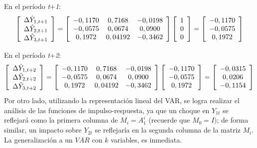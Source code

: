 En el per\'{i}odo \textit{t}$+$\textit{1}:
\[
\left[ {\begin{array}{*{20}c}
\Delta \hat{Y}_{1,t+1}\\
\Delta \hat{Y}_{2,t+1}\\
\Delta \hat{Y}_{3,t+1}\\
\end{array} } \right]=\left[ {\begin{array}{*{20}c}
-0,1170 & 0,7168 & -0,0198\\
-0,0575 & 0,0674 & 0,0900\\
0,1972 & 0,04192 & -0,3462\\
\end{array} } \right]\left[ {\begin{array}{*{20}c}
1\\
0\\
0\\
\end{array} } \right]=\left[ {\begin{array}{*{20}c}
-0,1170\\
-0,0575\\
0,1972\\
\end{array} } \right]
\]

En el per\'{i}odo \textit{t}$+$\textit{2}:
\[
\left[ {\begin{array}{*{20}c}
\Delta \hat{Y}_{1,t+2}\\
\Delta \hat{Y}_{2,t+2}\\
\Delta \hat{Y}_{3,t+2}\\
\end{array} } \right]=\left[ {\begin{array}{*{20}c}
-0,1170 & 0,7168 & -0,0198\\
-0,0575 & 0,0674 & 0,0900\\
0,1972 & 0,04192 & -0,3462\\
\end{array} } \right]\left[ {\begin{array}{*{20}c}
-0,1170\\
-0,0575\\
0,1972\\
\end{array} } \right]=\left[ {\begin{array}{*{20}c}
-0,0315\\
0,0206\\
-0,1154\\
\end{array} } \right]
\]
Por otro lado, utilizando la representaci\'{o}n lineal del VAR, se logra realizar el an\'{a}lisis de las funciones de impulso-respuesta, ya que un choque en $Y_{1t}$ se reflejar\'{a} como la primera columna de $M_{i}=A_{1}^{i}$ (recuerde que $M_{0}=I)$; de forma similar, un impacto sobre $Y_{2t}$ se reflejar\'{i}a en la segunda columna de la matriz 
$M_{i}$. La generalizaci\'{o}n a un $VAR$ con $k$ variables, es inmediata.\newline


